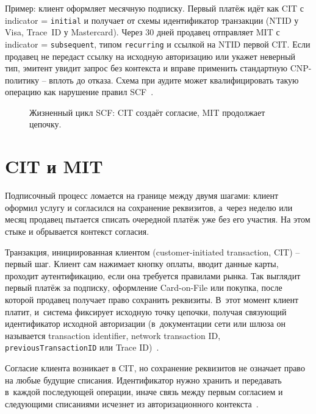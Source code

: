 Пример: клиент оформляет месячную подписку. Первый платёж идёт
как CIT с indicator = \texttt{initial} и
получает от схемы идентификатор транзакции (NTID у Visa, Trace~ID
у Mastercard). Через 30 дней продавец отправляет MIT с
indicator = \texttt{subsequent}, типом \texttt{recurring} и
ссылкой на NTID первой CIT. Если продавец не передаст ссылку
на исходную авторизацию или укажет неверный тип, эмитент увидит
запрос без контекста и вправе применить стандартную CNP-политику --
вплоть до отказа. Схема при аудите может квалифицировать такую
операцию как нарушение правил SCF~\cite{mc-tpr,visa-core-rules}.

\begin{figure}[tbp]
  \centering
  \caption{Жизненный цикл SCF: CIT создаёт согласие, MIT продолжает цепочку.}\label{fig:scf-lifecycle}
\end{figure}

\section{CIT и MIT}\label{sec:subscriptions-cit-mit}

Подписочный процесс ломается на границе между двумя шагами: клиент
оформил услугу и согласился на сохранение реквизитов, а~через
неделю или месяц продавец пытается списать очередной платёж уже
без его участия. На этом стыке и обрывается контекст согласия.

Транзакция, инициированная клиентом (customer-initiated transaction,
CIT) -- первый шаг. Клиент сам нажимает кнопку оплаты,
вводит данные карты, проходит аутентификацию, если она требуется
правилами рынка. Так выглядит первый платёж за подписку, оформление
Card-on-File или покупка, после которой продавец получает право
сохранить реквизиты. В~этот момент клиент платит, и~система фиксирует
исходную точку цепочки, получая связующий идентификатор исходной
авторизации (в~документации
  сети или шлюза он называется transaction identifier, network transaction
ID, \texttt{previousTransactionID} или Trace ID)~\cite{mc-tpr,cybs-initial-transactions,cybs-mc-subscription-mit}.

Согласие клиента возникает в CIT, но сохранение реквизитов
не означает право на любые будущие списания. Идентификатор нужно
хранить и передавать в~каждой последующей операции, иначе связь
между первым согласием и следующими списаниями исчезнет из
авторизационного контекста~\cite{mc-tpr,cybs-initial-transactions}.

